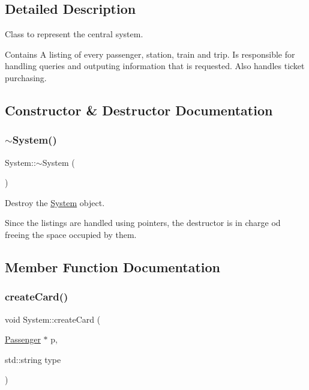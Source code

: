 \subsection{Detailed Description}
Class to represent the central system. 

Contains A listing of every passenger, station, train and trip. Is responsible for handling queries and outputing information that is requested. Also handles ticket purchasing. 

\subsection{Constructor \& Destructor Documentation}
\mbox{\label{classSystem_a3be70bb338e3f062f821173fd15680d0}} 
\subsubsection{\texorpdfstring{$\sim$\+System()}{~System()}}
{\footnotesize\ttfamily System\+::$\sim$\+System (\begin{DoxyParamCaption}{ }\end{DoxyParamCaption})}



Destroy the \mbox{\hyperlink{classSystem}{System}} object. 

Since the listings are handled using pointers, the destructor is in charge od freeing the space occupied by them. 

\subsection{Member Function Documentation}
\mbox{\label{classSystem_a9e317da5b607c6dee850089f340dd9e7}} 
\subsubsection{\texorpdfstring{create\+Card()}{createCard()}}
{\footnotesize\ttfamily void System\+::create\+Card (\begin{DoxyParamCaption}\item[{\mbox{\hyperlink{classPassenger}{Passenger}} $\ast$}]{p,  }\item[{std\+::string}]{type }\end{DoxyParamCaption})}



